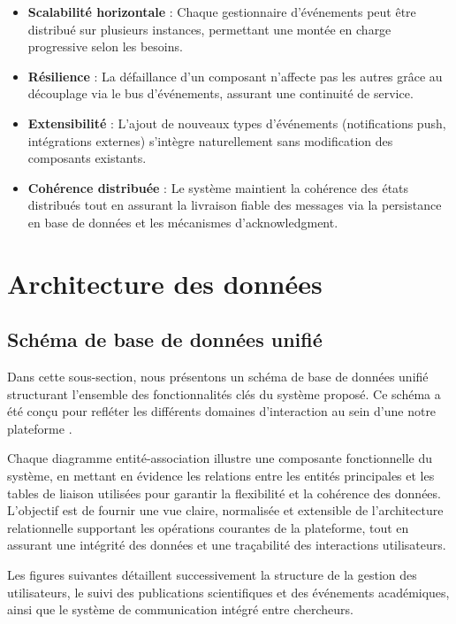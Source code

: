\documentclass[12pt]{rapportPfe}
\begin{document}
\begin{itemize}
    \item \textbf{Scalabilité horizontale} : Chaque gestionnaire d'événements peut être distribué sur plusieurs instances, permettant une montée en charge progressive selon les besoins.
    
    \item \textbf{Résilience} : La défaillance d'un composant n'affecte pas les autres grâce au découplage via le bus d'événements, assurant une continuité de service.
    
    \item \textbf{Extensibilité} : L'ajout de nouveaux types d'événements (notifications push, intégrations externes) s'intègre naturellement sans modification des composants existants.
    
    \item \textbf{Cohérence distribuée} : Le système maintient la cohérence des états distribués tout en assurant la livraison fiable des messages via la persistance en base de données et les mécanismes d'acknowledgment.
\end{itemize}

\FloatBarrier

\section{Architecture des données}

\subsection{Schéma de base de données unifié}

Dans cette sous-section, nous présentons un schéma de base de données unifié structurant l’ensemble des fonctionnalités clés du système proposé. Ce schéma a été conçu pour refléter les différents domaines d’interaction au sein d’une notre plateforme .

Chaque diagramme entité-association illustre une composante fonctionnelle du système, en mettant en évidence les relations entre les entités principales et les tables de liaison utilisées pour garantir la flexibilité et la cohérence des données. L’objectif est de fournir une vue claire, normalisée et extensible de l’architecture relationnelle supportant les opérations courantes de la plateforme, tout en assurant une intégrité des données et une traçabilité des interactions utilisateurs.

Les figures suivantes détaillent successivement la structure de la gestion des utilisateurs, le suivi des publications scientifiques et des événements académiques, ainsi que le système de communication intégré entre chercheurs.
\end{document}
